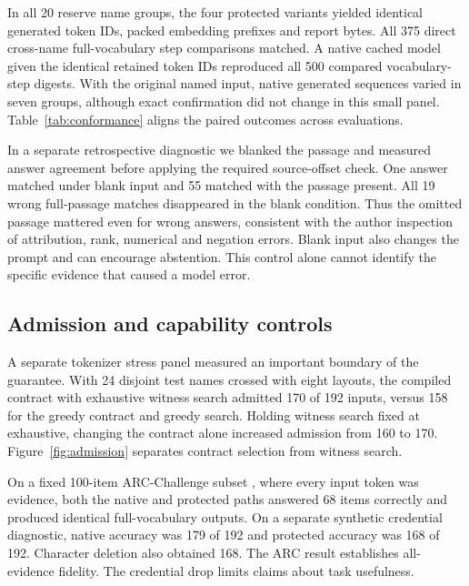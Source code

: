 \documentclass[11pt,a4paper]{article}
\begin{document}
In all 20 reserve name groups, the four protected variants yielded identical generated token IDs, packed embedding prefixes and report bytes. All 375 direct cross-name full-vocabulary step comparisons matched. A native cached model given the identical retained token IDs reproduced all 500 compared vocabulary-step digests. With the original named input, native generated sequences varied in seven groups, although exact confirmation did not change in this small panel. Table~\ref{tab:conformance} aligns the paired outcomes across evaluations.



In a separate retrospective diagnostic we blanked the passage and measured answer agreement before applying the required source-offset check. One answer matched under blank input and 55 matched with the passage present. All 19 wrong full-passage matches disappeared in the blank condition. Thus the omitted passage mattered even for wrong answers, consistent with the author inspection of attribution, rank, numerical and negation errors. Blank input also changes the prompt and can encourage abstention. This control alone cannot identify the specific evidence that caused a model error.

\subsection{Admission and capability controls}

A separate tokenizer stress panel measured an important boundary of the guarantee. With 24 disjoint test names crossed with eight layouts, the compiled contract with exhaustive witness search admitted 170 of 192 inputs, versus 158 for the greedy contract and greedy search. Holding witness search fixed at exhaustive, changing the contract alone increased admission from 160 to 170. Figure~\ref{fig:admission} separates contract selection from witness search.



On a fixed 100-item ARC-Challenge subset \citep{clark2018}, where every input token was evidence, both the native and protected paths answered 68 items correctly and produced identical full-vocabulary outputs. On a separate synthetic credential diagnostic, native accuracy was 179 of 192 and protected accuracy was 168 of 192. Character deletion also obtained 168. The ARC result establishes all-evidence fidelity. The credential drop limits claims about task usefulness.
\end{document}
